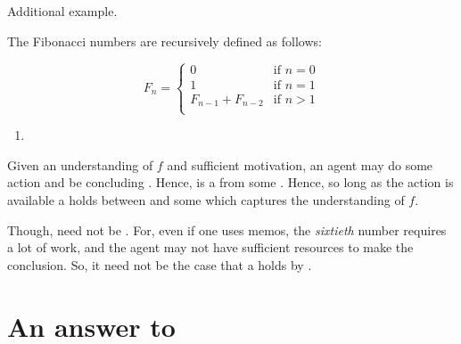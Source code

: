 \begin{note}
  Additional example.

  \begin{scenario}%
    \label{scen:fc:fib}%
    The Fibonacci numbers are recursively defined as follows:

    \[
      F_{n} = \left\{
        \begin{array}{ll}
          0 & \text{if } n = 0 \\
          1 & \text{if } n = 1 \\
          F_{n-1} + F_{n-2} & \text{if } n > 1 \\
        \end{array}
      \right.
    \]
  \end{scenario}

  \begin{enumerate}[label=C\thescenarioCounter., ref=(C\thescenarioCounter)]
  \item
    \label{scen:fc:fib:c}
  \end{enumerate}
  Given an understanding of \(f\) and sufficient motivation, an agent may do some action and be concluding .
  Hence,  is a \fc{} from some \pool{}.
  Hence, so long as the action is available a \ros{} holds between  and some \pool{} which captures the \agents{} understanding of \(f\).

  Though,  need not be .
  For, even if one uses memos, the \emph{sixtieth} number requires a lot of work, and the agent may not have sufficient resources to make the conclusion.
  So, it need not be the case that a \ros{} holds by \supportII{}.
\end{note}


\section{An answer to \qWhy{}}


